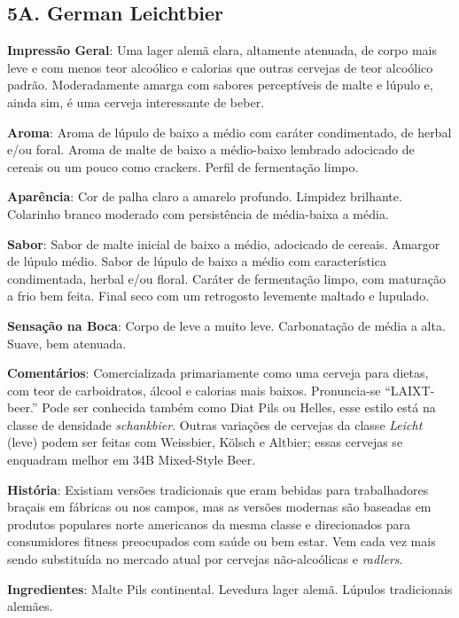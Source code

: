 \subsection*{5A. German Leichtbier}
\textbf{Impressão Geral}: Uma lager alemã clara, altamente atenuada, de corpo mais leve e com menos teor alcoólico e calorias que outras cervejas de teor alcoólico padrão. Moderadamente amarga com sabores perceptíveis de malte e lúpulo e, ainda sim, é uma cerveja interessante de beber.

\textbf{Aroma}: Aroma de lúpulo de baixo a médio com caráter condimentado, de herbal e/ou foral. Aroma de malte de baixo a médio-baixo lembrado adocicado de cereais ou um pouco como crackers. Perfil de fermentação limpo.

\textbf{Aparência}: Cor de palha claro a amarelo profundo. Limpidez brilhante. Colarinho branco moderado com persistência de média-baixa a média.

\textbf{Sabor}: Sabor de malte inicial de baixo a médio, adocicado de cereais. Amargor de lúpulo médio. Sabor de lúpulo de baixo a médio com característica condimentada, herbal e/ou floral. Caráter de fermentação limpo, com maturação a frio bem feita. Final seco com um retrogosto levemente maltado e lupulado.

\textbf{Sensação na Boca}: Corpo de leve a muito leve. Carbonatação de média a alta. Suave, bem atenuada.

\textbf{Comentários}: Comercializada primariamente como uma cerveja para dietas, com teor de carboidratos, álcool e calorias mais baixos. Pronuncia-se “LAIXT-beer.” Pode ser conhecida também como Diat Pils ou Helles, esse estilo está na classe de densidade \textit{schankbier}. Outras variações de cervejas da classe \textit{Leicht} (leve) podem ser feitas com Weissbier, Kölsch e Altbier; essas cervejas se enquadram melhor em 34B Mixed-Style Beer.

\textbf{História}: Existiam versões tradicionais que eram bebidas para trabalhadores braçais em fábricas ou nos campos, mas as versões modernas são baseadas em produtos populares norte americanos da mesma classe e direcionados para consumidores fitness preocupados com saúde ou bem estar. Vem cada vez mais sendo substituída no mercado atual por cervejas não-alcoólicas e \textit{radlers}.

\textbf{Ingredientes}: Malte Pils continental. Levedura lager alemã. Lúpulos tradicionais alemães.

